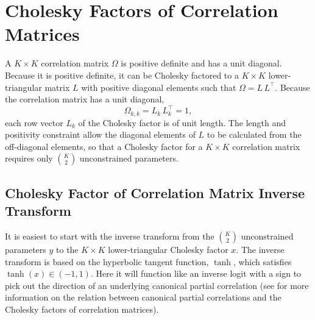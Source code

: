 \section{Cholesky Factors of Correlation Matrices}

A $K \times K$ correlation matrix $\Omega$ is positive definite and
has a unit diagonal.  Because it is positive definite, it can be
Cholesky factored to a $K \times K$ lower-triangular matrix $L$ with
positive diagonal elements such that $\Omega = L\,L^{\top}$.  Because
the correlation matrix has a unit diagonal,
\[
\Omega_{k,k} = L_k\,L_k^{\top} = 1,
\]
each row vector $L_k$ of the Cholesky factor is of unit length.  The
length and positivity constraint allow the diagonal elements of $L$ to
be calculated from the off-diagonal elements, so that a Cholesky
factor for a $K \times K$ correlation matrix requires only
$\binom{K}{2}$ unconstrained parameters.

\subsection{Cholesky Factor of Correlation Matrix Inverse Transform}

It is easiest to start with the inverse transform from the
$\binom{K}{2}$ unconstrained parameters $y$ to the $K \times K$
lower-triangular Cholesky factor $x$.  The inverse transform is based
on the hyperbolic tangent function, $\tanh$, which satisfies $\tanh(x)
\in (-1,1)$.  Here it will function like an inverse logit with a sign
to pick out the direction of an underlying canonical partial
correlation (see  for more
information on the relation between canonical partial correlations and
the Cholesky factors of correlation matrices).

